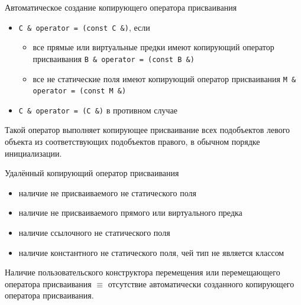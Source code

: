 \documentclass[unknownkeysallowed,xcolor=table]{beamer}
\begin{document}
\begin{frame}{Автоматическое создание копирующего оператора присваивания}
  \begin{itemize}
    \item \lstinline{C & operator = (const C &)}, если
      \begin{itemize}
        \item все прямые или виртуальные предки имеют копирующий оператор присваивания \lstinline{B & operator = (const B &)}
        \item все не статические поля имеют копирующий оператор присваивания \lstinline{M & operator = (const M &)}
      \end{itemize}
    \item \lstinline{C & operator = (C &)} в противном случае
  \end{itemize}

  \vspace{1em}

  Такой оператор выполняет копирующее присваивание всех подобъектов левого объекта из соответствующих подобъектов правого, в обычном порядке инициализации.
\end{frame}

\begin{frame}{Удалённый копирующий оператор присваивания}
  \begin{itemize}
    \item наличие не присваиваемого не статического поля \vspace{0.5em}
    \item наличие не присваиваемого прямого или виртуального предка \vspace{0.5em}
    \item наличие ссылочного не статического поля \vspace{0.5em}
    \item наличие константного не статического поля, чей тип не является классом
  \end{itemize}

  \vspace{1em}

  Наличие пользовательского конструктора перемещения или перемещающего оператора присваивания $\equiv$ отсутствие автоматически созданного копирующего оператора
  присваивания.
\end{frame}
\end{document}
